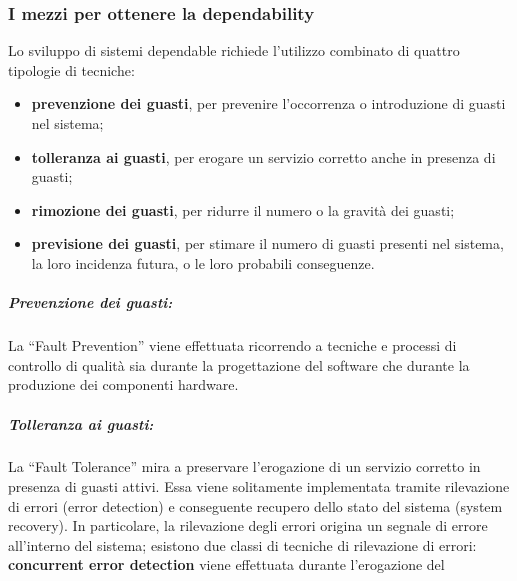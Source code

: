 \documentclass[14pt]{extarticle}
\begin{document}
\subsubsection{I mezzi per ottenere la dependability}
Lo sviluppo di sistemi dependable richiede l'utilizzo combinato di quattro
tipologie di tecniche:
\begin{itemize}
\item \textbf{prevenzione dei guasti}, per prevenire l'occorrenza o introduzione di
guasti nel sistema;
\item \textbf{tolleranza ai guasti}, per erogare un servizio corretto anche in presenza
di guasti;
\item \textbf{rimozione dei guasti}, per ridurre il numero o la gravità dei guasti;
\item \textbf{previsione dei guasti}, per stimare il numero di guasti presenti nel
sistema, la loro incidenza futura, o le loro probabili conseguenze.
\end{itemize}
\subparagraph{Prevenzione dei guasti: }
La “Fault Prevention” viene effettuata ricorrendo a tecniche e processi di controllo di qualità sia durante la progettazione del software che durante la produzione dei componenti hardware.

\subparagraph{Tolleranza ai guasti: }
La “Fault Tolerance” mira a preservare l'erogazione di un servizio corretto in
presenza di guasti attivi. Essa viene solitamente implementata tramite rilevazione di errori (error detection) e conseguente recupero dello stato del sistema
(system recovery). In particolare, la rilevazione degli errori origina un segnale
di errore all'interno del sistema; esistono due classi di tecniche di rilevazione
di errori: \textbf{concurrent error detection} viene effettuata durante l'erogazione del
\end{document}
